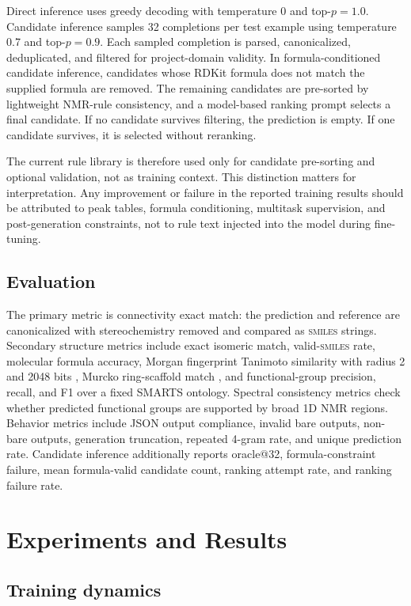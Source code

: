 \documentclass{article}
\newcommand{\smiles}{\textsc{smiles}}
\begin{document}
Direct inference uses greedy decoding with temperature 0 and top-\(p=1.0\). Candidate inference samples 32 completions per test example using temperature 0.7 and top-\(p=0.9\). Each sampled completion is parsed, canonicalized, deduplicated, and filtered for project-domain validity. In formula-conditioned candidate inference, candidates whose RDKit formula does not match the supplied formula are removed. The remaining candidates are pre-sorted by lightweight NMR-rule consistency, and a model-based ranking prompt selects a final candidate. If no candidate survives filtering, the prediction is empty. If one candidate survives, it is selected without reranking.

The current rule library is therefore used only for candidate pre-sorting and optional validation, not as training context. This distinction matters for interpretation. Any improvement or failure in the reported training results should be attributed to peak tables, formula conditioning, multitask supervision, and post-generation constraints, not to rule text injected into the model during fine-tuning.

\subsection{Evaluation}

The primary metric is connectivity exact match: the prediction and reference are canonicalized with stereochemistry removed and compared as \smiles{} strings. Secondary structure metrics include exact isomeric match, valid-\smiles{} rate, molecular formula accuracy, Morgan fingerprint Tanimoto similarity with radius 2 and 2048 bits \cite{Morgan1965,Rogers2010,Tanimoto1958}, Murcko ring-scaffold match \cite{Bemis1996}, and functional-group precision, recall, and F1 over a fixed SMARTS ontology. Spectral consistency metrics check whether predicted functional groups are supported by broad 1D NMR regions. Behavior metrics include JSON output compliance, invalid bare outputs, non-bare outputs, generation truncation, repeated 4-gram rate, and unique prediction rate. Candidate inference additionally reports oracle@32, formula-constraint failure, mean formula-valid candidate count, ranking attempt rate, and ranking failure rate.

\section{Experiments and Results}

\subsection{Training dynamics}
\end{document}
